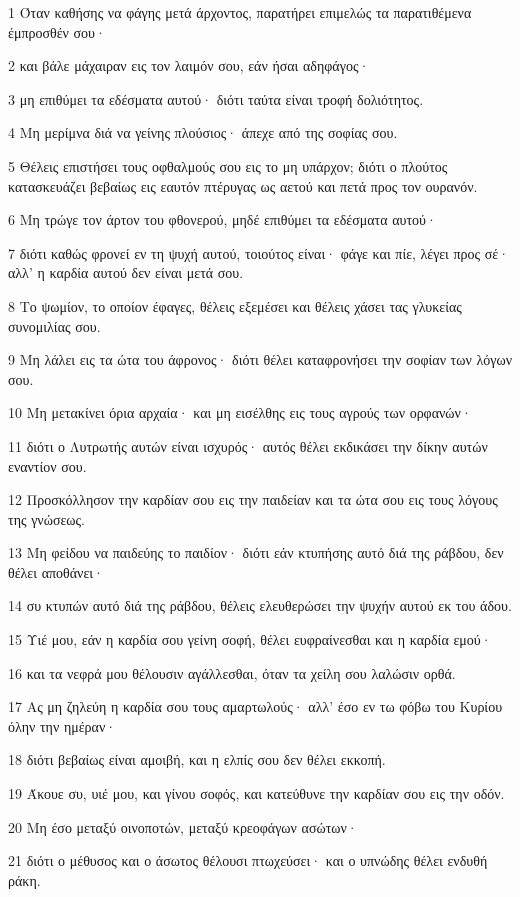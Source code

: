\par 1 Όταν καθήσης να φάγης μετά άρχοντος, παρατήρει επιμελώς τα παρατιθέμενα έμπροσθέν σου·
\par 2 και βάλε μάχαιραν εις τον λαιμόν σου, εάν ήσαι αδηφάγος·
\par 3 μη επιθύμει τα εδέσματα αυτού· διότι ταύτα είναι τροφή δολιότητος.
\par 4 Μη μερίμνα διά να γείνης πλούσιος· άπεχε από της σοφίας σου.
\par 5 Θέλεις επιστήσει τους οφθαλμούς σου εις το μη υπάρχον; διότι ο πλούτος κατασκευάζει βεβαίως εις εαυτόν πτέρυγας ως αετού και πετά προς τον ουρανόν.
\par 6 Μη τρώγε τον άρτον του φθονερού, μηδέ επιθύμει τα εδέσματα αυτού·
\par 7 διότι καθώς φρονεί εν τη ψυχή αυτού, τοιούτος είναι· φάγε και πίε, λέγει προς σέ· αλλ' η καρδία αυτού δεν είναι μετά σου.
\par 8 Το ψωμίον, το οποίον έφαγες, θέλεις εξεμέσει και θέλεις χάσει τας γλυκείας συνομιλίας σου.
\par 9 Μη λάλει εις τα ώτα του άφρονος· διότι θέλει καταφρονήσει την σοφίαν των λόγων σου.
\par 10 Μη μετακίνει όρια αρχαία· και μη εισέλθης εις τους αγρούς των ορφανών·
\par 11 διότι ο Λυτρωτής αυτών είναι ισχυρός· αυτός θέλει εκδικάσει την δίκην αυτών εναντίον σου.
\par 12 Προσκόλλησον την καρδίαν σου εις την παιδείαν και τα ώτα σου εις τους λόγους της γνώσεως.
\par 13 Μη φείδου να παιδεύης το παιδίον· διότι εάν κτυπήσης αυτό διά της ράβδου, δεν θέλει αποθάνει·
\par 14 συ κτυπών αυτό διά της ράβδου, θέλεις ελευθερώσει την ψυχήν αυτού εκ του άδου.
\par 15 Υιέ μου, εάν η καρδία σου γείνη σοφή, θέλει ευφραίνεσθαι και η καρδία εμού·
\par 16 και τα νεφρά μου θέλουσιν αγάλλεσθαι, όταν τα χείλη σου λαλώσιν ορθά.
\par 17 Ας μη ζηλεύη η καρδία σου τους αμαρτωλούς· αλλ' έσο εν τω φόβω του Κυρίου όλην την ημέραν·
\par 18 διότι βεβαίως είναι αμοιβή, και η ελπίς σου δεν θέλει εκκοπή.
\par 19 Άκουε συ, υιέ μου, και γίνου σοφός, και κατεύθυνε την καρδίαν σου εις την οδόν.
\par 20 Μη έσο μεταξύ οινοποτών, μεταξύ κρεοφάγων ασώτων·
\par 21 διότι ο μέθυσος και ο άσωτος θέλουσι πτωχεύσει· και ο υπνώδης θέλει ενδυθή ράκη.

